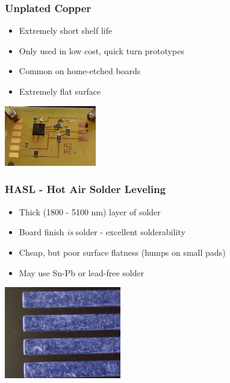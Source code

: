 \documentclass{beamer}
\begin{document}
\begin{frame}
\frametitle{Unplated Copper}
\begin{itemize}
\item Extremely short shelf life
\item Only used in low cost, quick turn prototypes
\item Common on home-etched boards
\item Extremely flat surface
\end{itemize}
\begin{center}
\includegraphics[width=4cm,keepaspectratio]{no-plating.jpg}
\end{center}
\end{frame}

\begin{frame}
\frametitle{HASL - Hot Air Solder Leveling}
\begin{itemize}
\item Thick (1800 - 5100 nm) layer of solder
\item Board finish \emph{is} solder - excellent solderability
\item Cheap, but poor surface flatness (humps on small pads)
\item May use Sn-Pb or lead-free solder
\end{itemize}
\begin{center}
\includegraphics[height=4cm,keepaspectratio]{hasl.jpg}
\end{center}
\end{frame}
\end{document}
